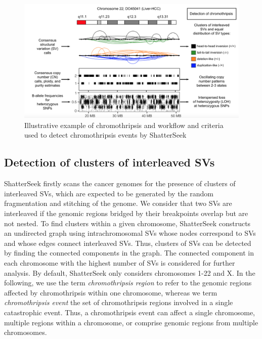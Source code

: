 \documentclass[twoside,a4wide,11pt]{article}\usepackage[]{graphicx}\usepackage[]{color}
\begin{document}
\begin{figure}[htb]
\begin{center}
\includegraphics[width=\textwidth]{workflow_tutorial.png}
\caption{Illustrative example of chromothripsis and workflow and criteria used to detect chromothripsis events by ShatterSeek}
\end{center}
\end{figure}

\subsection{Detection of clusters of interleaved SVs}

ShatterSeek firstly scans the cancer genomes for the presence of clusters of interleaved SVs,
which are expected to be generated by the random fragmentation and stitching of the genome.
We consider that two SVs are interleaved if the genomic regions bridged by their breakpoints overlap but are not nested. 
To find clusters within a given chromosome, 
ShatterSeek constructs an undirected graph using intrachromosomal SVs 
whose nodes correspond to SVs and whose edges connect interleaved SVs. 
Thus, clusters of SVs can be detected by finding the connected components in the graph. 
The connected component in each chromosome with the highest number of SVs is considered for further analysis. 
By default, ShatterSeek only considers chromosomes 1-22 and X.
In the following, we use the term {\it chromothripsis region} to refer to the genomic regions affected by chromothripsis within one chromosome, whereas we term {\it chromothripsis event} the set of chromothripsis regions involved in a single catastrophic event.
Thus, a chromothripsis event can affect a single chromosome, multiple regions within a chromosome, or comprise genomic regions from multiple chromosomes.
\end{document}
